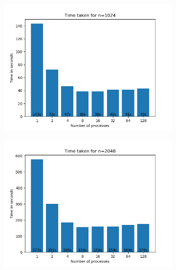 \documentclass[a4paper]{extarticle}
\begin{document}
\begin{figure}[h!]
\centering
\begin{subfigure}{.5\textwidth}
  \centering
  \includegraphics[width=1.1\linewidth]{../Plot/bar1024.png}
\end{subfigure}%
\begin{subfigure}{.5\textwidth}
  \centering
  \includegraphics[width=1.1\linewidth]{../Plot/bar2048.png}
\end{subfigure}
\end{figure}
\end{document}
